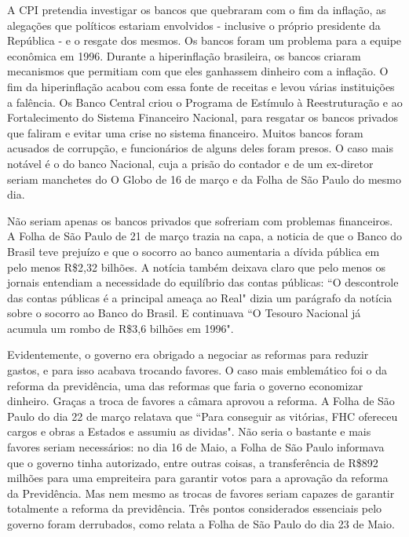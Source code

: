 \documentclass{article}
\begin{document}
A CPI pretendia investigar os bancos que quebraram com o fim da inflação, as alegações que políticos estariam envolvidos - inclusive o próprio presidente da República - e o resgate dos mesmos. Os bancos foram um problema para a equipe econômica em 1996. Durante a hiperinflação brasileira, os bancos criaram mecanismos que permitiam com que eles ganhassem dinheiro com a inflação. O fim da hiperinflação acabou com essa fonte de receitas e levou várias instituições a falência. Os Banco Central criou o Programa de Estímulo à Reestruturação e ao Fortalecimento do Sistema Financeiro Nacional, para resgatar os bancos privados que faliram e evitar uma crise no sistema financeiro. Muitos bancos foram acusados de corrupção, e funcionários de alguns deles foram presos. O caso mais notável é o do banco Nacional, cuja a prisão do contador e de um ex-diretor seriam manchetes do O Globo de 16 de março e da Folha de São Paulo do mesmo dia.

Não seriam apenas os bancos privados que sofreriam com problemas financeiros. A Folha de São Paulo de 21 de março trazia na capa, a noticia de que o Banco do Brasil teve prejuízo e que o socorro ao banco aumentaria a dívida pública em pelo menos R\$2,32 bilhões. A notícia também deixava claro que pelo menos os jornais entendiam a necessidade do equilíbrio das contas públicas: ``O descontrole das contas públicas é a principal ameaça ao Real" dizia um parágrafo da notícia sobre o socorro ao Banco do Brasil. E continuava ``O Tesouro Nacional já acumula um rombo de R\$3,6 bilhões em 1996". 

Evidentemente, o governo era obrigado a negociar as reformas para reduzir gastos, e para isso acabava trocando favores. O caso mais emblemático foi o da reforma da previdência, uma das reformas que faria o governo economizar dinheiro. Graças a troca de favores a câmara aprovou a reforma. A Folha de São Paulo do dia 22 de março relatava que ``Para conseguir as vitórias, FHC ofereceu cargos e obras a Estados e assumiu as dividas". Não seria o bastante e mais favores seriam necessários: no dia 16 de Maio, a Folha de São Paulo informava que o governo tinha autorizado, entre outras coisas, a transferência de R\$892 milhões para uma empreiteira para garantir votos para a aprovação da reforma da Previdência. Mas nem mesmo as trocas de favores seriam capazes de garantir totalmente a reforma da previdência. Três pontos considerados essenciais pelo governo foram derrubados, como relata a Folha de São Paulo do dia 23 de Maio.
\end{document}
